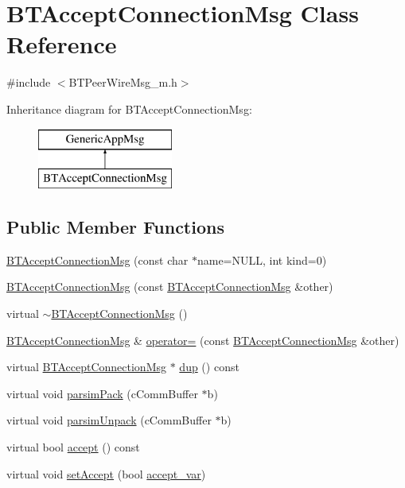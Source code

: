 \hypertarget{classBTAcceptConnectionMsg}{}\section{B\+T\+Accept\+Connection\+Msg Class Reference}
\label{classBTAcceptConnectionMsg}


{\ttfamily \#include $<$B\+T\+Peer\+Wire\+Msg\+\_\+m.\+h$>$}

Inheritance diagram for B\+T\+Accept\+Connection\+Msg\+:\begin{figure}[H]
\begin{center}
\leavevmode
\includegraphics[height=2.000000cm]{classBTAcceptConnectionMsg}
\end{center}
\end{figure}
\subsection*{Public Member Functions}
\begin{DoxyCompactItemize}
\item 
\hyperlink{classBTAcceptConnectionMsg_add0db7db09d41c43b5ddca304d91516c}{B\+T\+Accept\+Connection\+Msg} (const char $\ast$name=N\+U\+L\+L, int kind=0)
\item 
\hyperlink{classBTAcceptConnectionMsg_ae45d54f245653f5f17b3656734a761df}{B\+T\+Accept\+Connection\+Msg} (const \hyperlink{classBTAcceptConnectionMsg}{B\+T\+Accept\+Connection\+Msg} \&other)
\item 
virtual \hyperlink{classBTAcceptConnectionMsg_a7852a9811fc9fa71ed9b77836bb5545f}{$\sim$\+B\+T\+Accept\+Connection\+Msg} ()
\item 
\hyperlink{classBTAcceptConnectionMsg}{B\+T\+Accept\+Connection\+Msg} \& \hyperlink{classBTAcceptConnectionMsg_a0c5ce6d8a8d3a4b6ddf543a400ab1ec2}{operator=} (const \hyperlink{classBTAcceptConnectionMsg}{B\+T\+Accept\+Connection\+Msg} \&other)
\item 
virtual \hyperlink{classBTAcceptConnectionMsg}{B\+T\+Accept\+Connection\+Msg} $\ast$ \hyperlink{classBTAcceptConnectionMsg_ad5edeb6c952a9ea0561113811734588a}{dup} () const 
\item 
virtual void \hyperlink{classBTAcceptConnectionMsg_a7c10fa7abe9cf9d3675f500f59cc790e}{parsim\+Pack} (c\+Comm\+Buffer $\ast$b)
\item 
virtual void \hyperlink{classBTAcceptConnectionMsg_a9aabb54dfe3eefd97bcefb28d22bc9a6}{parsim\+Unpack} (c\+Comm\+Buffer $\ast$b)
\item 
virtual bool \hyperlink{classBTAcceptConnectionMsg_a75e754e43ade635f7b220019657166e7}{accept} () const 
\item 
virtual void \hyperlink{classBTAcceptConnectionMsg_a85c7f33d626248b0395210496e5c1a93}{set\+Accept} (bool \hyperlink{classBTAcceptConnectionMsg_ab5c783dcc784f63d070c575f46426882}{accept\+\_\+var})
\end{DoxyCompactItemize}
